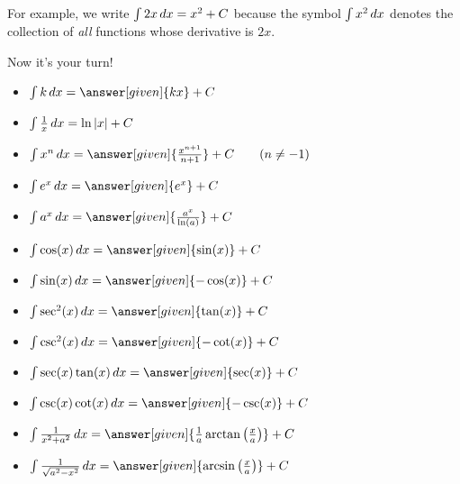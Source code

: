 \documentclass[nooutcomes]{ximera}
\begin{document}

For example, we write $\int 2x \mathop{}\!d x = x^2+C$ because the symbol $\int x^2 \mathop{}\!d x$ denotes the collection of \emph{all} functions whose derivative is $2x$. 

Now it's your turn! 


\begin{theorem}\hfil
\begin{itemize}
\item $\int k \d x= \answer[given]{k x}+C$
\item $\int \frac{1}{x} \mathop{}\!d x= \ln|x|+C$
\item $\int x^n \d x= \answer[given]{\frac{x^{n+1}}{n+1}}+C\qquad(n\ne-1)$
\item $\int e^x \d x= \answer[given]{e^x} + C$
\item $\int a^x \d x= \answer[given]{\frac{a^x}{\ln(a)}}+C$
\item $\int \cos(x) \d x = \answer[given]{\sin(x)} + C$
\item $\int \sin(x) \d x = \answer[given]{-\cos(x)} + C$  
\item $\int \sec^2(x) \d x = \answer[given]{\tan(x)} + C$
\item $\int \csc^2(x) \d x = \answer[given]{-\cot(x)} + C$
\item $\int \sec(x)\tan(x) \d x = \answer[given]{\sec(x)} + C$
\item $\int \csc(x)\cot(x) \d x = \answer[given]{-\csc(x)} + C$
\item $\int \frac{1}{x^2+a^2}\d x = \answer[given]{\frac{1}{a}\arctan\left(\frac{x}{a}\right)} + C$
\item $\int \frac{1}{\sqrt{a^2-x^2}}\d x= \answer[given]{\arcsin\left(\frac{x}{a}\right)}+C$
\end{itemize}
\end{theorem}
\end{document}
